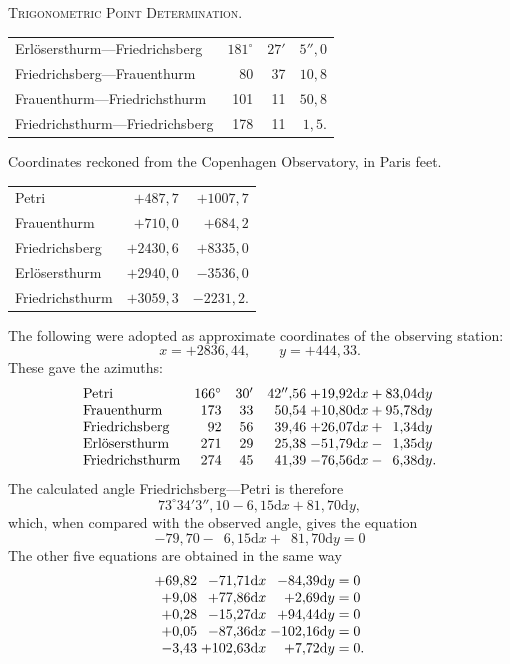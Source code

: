 \clearpage
{}\hfill\textsc{Trigonometric Point Determination.}\hfill\mbox{}\par\medskip
\begin{center}
\begin{tabular}{lrrr}
Erlösersthurm---Friedrichsberg&$181^\circ$&$27'$&$5''{,}0$\\
Friedrichsberg---Frauenthurm&80&37&$10{,}8$\\
Frauenthurm---Friedrichsthurm&101&11&$50{,}8$\\
Friedrichsthurm---Friedrichsberg&178&11&$1{,}5$.
\end{tabular}
\end{center}
\begin{center}
Coordinates reckoned from the Copenhagen Observatory, in Paris feet.
\end{center}
\begin{center}
\begin{tabular}{lrr}
Petri&$+487{,}7$&$+1007{,}7$\\
Frauenthurm&$+710{,}0$&$+684{,}2$\\
Friedrichsberg&$+2430{,}6$&$+8335{,}0$\\
Erlösersthurm&$+2940{,}0$&$-3536{,}0$\\
Friedrichsthurm&$+3059{,}3$&$-2231{,}2$.
\end{tabular}
\end{center}
The following were adopted as approximate coordinates of the observing station:
\[
x=+2836{,}44,\qquad y=+444{,}33.
\]
These gave the azimuths:
\[
\begin{array}{lrrr@{\;}l}
\text{Petri}&166^\circ&30'&42''{,}56&+19{,}92\mathrm dx+83{,}04\mathrm dy\\
\text{Frauenthurm}&173&33&50{,}54&+10{,}80\mathrm dx+95{,}78\mathrm dy\\
\text{Friedrichsberg}&92&56&39{,}46&+26{,}07\mathrm dx+\phantom01{,}34\mathrm dy\\
\text{Erlösersthurm}&271&29&25{,}38&-51{,}79\mathrm dx-\phantom01{,}35\mathrm dy\\
\text{Friedrichsthurm}&274&45&41{,}39&-76{,}56\mathrm dx-\phantom06{,}38\mathrm dy.
\end{array}
\]
The calculated angle Friedrichsberg---Petri is therefore
\[
73^\circ34'3''{,}10-6{,}15\mathrm dx+81{,}70\mathrm dy,
\]
which, when compared with the observed angle, gives the equation
\[
-79{,}70-\phantom06{,}15\mathrm dx+\phantom081{,}70\mathrm dy=0
\]
The other five equations are obtained in the same way
\[
\begin{array}{r@{\;}r@{\;}r@{\;}l}
+69{,}82&-71{,}71\mathrm dx&-84{,}39\mathrm dy&=0\\
+9{,}08&+77{,}86\mathrm dx&+2{,}69\mathrm dy&=0\\
+0{,}28&-15{,}27\mathrm dx&+94{,}44\mathrm dy&=0\\
+0{,}05&-87{,}36\mathrm dx&-102{,}16\mathrm dy&=0\\
-3{,}43&+102{,}63\mathrm dx&+7{,}72\mathrm dy&=0.
\end{array}
\]
